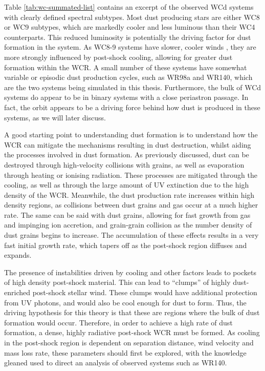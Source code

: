 Table \ref{tab:wc-summated-list} contains an excerpt of the observed WCd systems with clearly defined spectral subtypes.
Most dust producing stars are either WC8 or WC9 subtypes, which are markedly cooler and less luminous than their WC4 counterparts.
This reduced luminosity is potentially the driving factor for dust formation in the system.
As WC8-9 systems have slower, cooler winds \parencite{niedzielskiKinematicalStructureWolfRayet2002}, they are more strongly influenced by post-shock cooling, allowing for greater dust formation within the WCR.
A small number of these systems have somewhat variable or episodic dust production cycles, such as WR98a and WR140, which are the two systems being simulated in this thesis.
Furthermore, the bulk of WCd systems do appear to be in binary systems with a close periastron passage.
In fact, the orbit appears to be a driving force behind how dust is produced in these systems, as we will later discuss.

A good starting point to understanding dust formation is to understand how the WCR can mitigate the mechanisms resulting in dust destruction, whilst aiding the processes involved in dust formation.
As previously discussed, dust can be destroyed through high-velocity collisions with grains, as well as evaporation through heating or ionising radiation.
These processes are mitigated through the cooling, as well as through the large amount of UV extinction due to the high density of the WCR.
Meanwhile, the dust production rate increases within high density regions, as collisions between dust grains and gas occur at a much higher rate.
The same can be said with dust grains, allowing for fast growth from gas and impinging ion accretion, and grain-grain collision as the number density of dust grains begins to increase.
The accumulation of these effects results in a very fast initial growth rate, which tapers off as the post-shock region diffuses and expands.

The presence of instabilities driven by cooling and other factors leads to pockets of high density post-shock material.
This can lead to ``clumps'' of highly dust-enriched post-shock stellar wind.
These clumps would have additional protection from UV photons, and would also be cool enough for dust to form.
Thus, the driving hypothesis for this theory is that these are regions where the bulk of dust formation would occur.
Therefore, in order to achieve a high rate of dust formation, a dense, highly radiative post-shock WCR must be formed.
As cooling in the post-shock region is dependent on separation distance, wind velocity and mass loss rate, these parameters should first be explored, with the knowledge gleaned used to direct an analysis of observed systems such as WR140.

